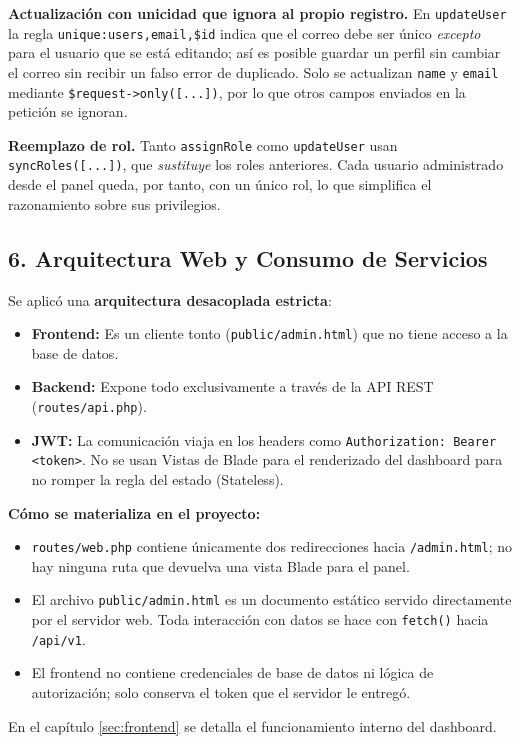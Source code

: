 \textbf{Actualización con unicidad que ignora al propio registro.} En \texttt{updateUser} la regla \texttt{unique:users,email,\$id} indica que el correo debe ser único \emph{excepto} para el usuario que se está editando; así es posible guardar un perfil sin cambiar el correo sin recibir un falso error de duplicado. Solo se actualizan \texttt{name} y \texttt{email} mediante \texttt{\$request->only([...])}, por lo que otros campos enviados en la petición se ignoran.

\textbf{Reemplazo de rol.} Tanto \texttt{assignRole} como \texttt{updateUser} usan \texttt{syncRoles([...])}, que \emph{sustituye} los roles anteriores. Cada usuario administrado desde el panel queda, por tanto, con un único rol, lo que simplifica el razonamiento sobre sus privilegios.

\subsection{6. Arquitectura Web y Consumo de Servicios}
Se aplicó una \textbf{arquitectura desacoplada estricta}:
\begin{itemize}
    \item \textbf{Frontend:} Es un cliente tonto (\texttt{public/admin.html}) que no tiene acceso a la base de datos.
    \item \textbf{Backend:} Expone todo exclusivamente a través de la API REST (\texttt{routes/api.php}).
    \item \textbf{JWT:} La comunicación viaja en los headers como \texttt{Authorization: Bearer <token>}. No se usan Vistas de Blade para el renderizado del dashboard para no romper la regla del estado (Stateless).
\end{itemize}

\textbf{Cómo se materializa en el proyecto:}
\begin{itemize}
    \item \texttt{routes/web.php} contiene únicamente dos redirecciones hacia \texttt{/admin.html}; no hay ninguna ruta que devuelva una vista Blade para el panel.
    \item El archivo \texttt{public/admin.html} es un documento estático servido directamente por el servidor web. Toda interacción con datos se hace con \texttt{fetch()} hacia \texttt{/api/v1}.
    \item El frontend no contiene credenciales de base de datos ni lógica de autorización; solo conserva el token que el servidor le entregó.
\end{itemize}
En el capítulo \ref{sec:frontend} se detalla el funcionamiento interno del dashboard.
